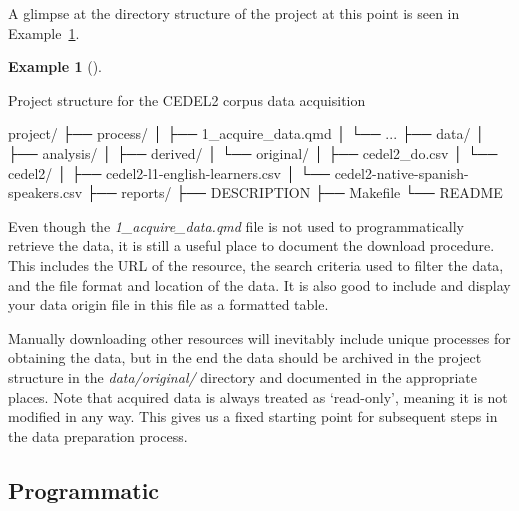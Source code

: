 \documentclass[
  letterpaper,
  DIV=11,
  numbers=noendperiod]{scrreprt}
\newenvironment{Shaded}{\begin{snugshade}}{\end{snugshade}}
\newcommand{\ExtensionTok}[1]{\textcolor[rgb]{0.00,0.00,0.00}{#1}}
\newcommand{\NormalTok}[1]{\textcolor[rgb]{0.00,0.00,0.00}{#1}}
\theoremstyle{definition}
\newtheorem{example}{Example}[chapter]
\theoremstyle{remark}
\begin{document}
A glimpse at the directory structure of the project at this point is
seen in Example~\ref{exm-ad-cedel2-structure}.

\begin{example}[]\protect\hypertarget{exm-ad-cedel2-structure}{}\label{exm-ad-cedel2-structure}

Project structure for the CEDEL2 corpus data acquisition

\begin{Shaded}
\begin{Highlighting}[]
\ExtensionTok{project/}
\ExtensionTok{├──}\NormalTok{ process/}
\ExtensionTok{│}\NormalTok{   ├── 1\_acquire\_data.qmd}
\ExtensionTok{│}\NormalTok{   └── ...}
\ExtensionTok{├──}\NormalTok{ data/}
\ExtensionTok{│}\NormalTok{   ├── analysis/}
\ExtensionTok{│}\NormalTok{   ├── derived/}
\ExtensionTok{│}\NormalTok{   └── original/}
\ExtensionTok{│}\NormalTok{       ├── cedel2\_do.csv}
\ExtensionTok{│}\NormalTok{       └── cedel2/}
\ExtensionTok{│}\NormalTok{           ├── cedel2{-}l1{-}english{-}learners.csv}
\ExtensionTok{│}\NormalTok{           └── cedel2{-}native{-}spanish{-}speakers.csv}
\ExtensionTok{├──}\NormalTok{ reports/}
\ExtensionTok{├──}\NormalTok{ DESCRIPTION}
\ExtensionTok{├──}\NormalTok{ Makefile}
\ExtensionTok{└──}\NormalTok{ README}
\end{Highlighting}
\end{Shaded}

\end{example}

Even though the \emph{1\_acquire\_data.qmd} file is not used to
programmatically retrieve the data, it is still a useful place to
document the download procedure. This includes the URL of the resource,
the search criteria used to filter the data, and the file format and
location of the data. It is also good to include and display your data
origin file in this file as a formatted table.

Manually downloading other resources will inevitably include unique
processes for obtaining the data, but in the end the data should be
archived in the project structure in the \emph{data/original/} directory
and documented in the appropriate places. Note that acquired data is
always treated as `read-only', meaning it is not modified in any way.
This gives us a fixed starting point for subsequent steps in the data
preparation process.

\subsection{Programmatic}\label{programmatic}
\end{document}
